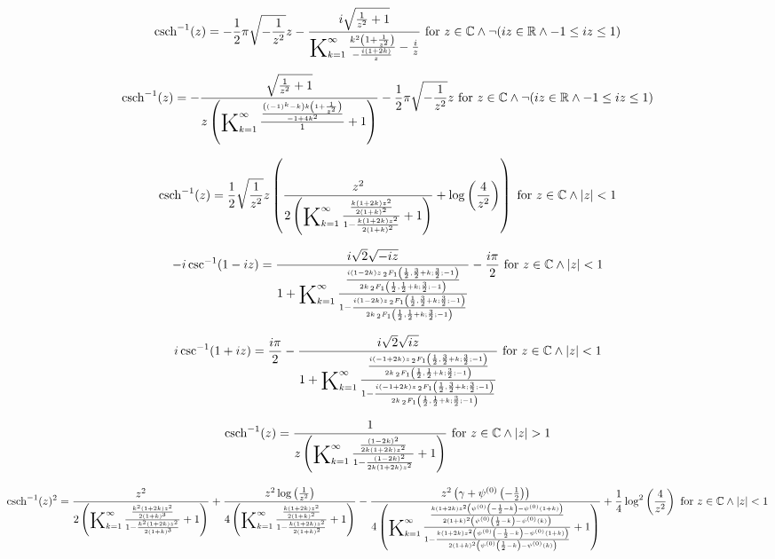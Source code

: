 \documentclass{article}
\newcommand{\bigK}{\mathop{\raisebox{-5pt}{\huge K}}}
\begin{document}
\[\text{csch}^{-1}(z)=-\frac{1}{2} \pi  \sqrt{-\frac{1}{z^2}} z-\frac{i \sqrt{\frac{1}{z^2}+1}}{\bigK_{k=1}^{\infty}\frac{k^2 \left(1+\frac{1}{z^2}\right)}{-\frac{i (1+2 k)}{z}}-\frac{i}{z}}\text{ for }z\in \mathbb{C}\land \neg (i z\in \mathbb{R}\land -1\leq i z\leq 1)\] 

\[\text{csch}^{-1}(z)=-\frac{\sqrt{\frac{1}{z^2}+1}}{z \left(\bigK_{k=1}^{\infty}\frac{\frac{\left((-1)^k-k\right) k \left(1+\frac{1}{z^2}\right)}{-1+4 k^2}}{1}+1\right)}-\frac{1}{2} \pi  \sqrt{-\frac{1}{z^2}} z\text{ for }z\in \mathbb{C}\land \neg (i z\in \mathbb{R}\land -1\leq i z\leq 1)\] 

\[\text{csch}^{-1}(z)=\frac{1}{2} \sqrt{\frac{1}{z^2}} z \left(\frac{z^2}{2 \left(\bigK_{k=1}^{\infty}\frac{\frac{k (1+2 k) z^2}{2 (1+k)^2}}{1-\frac{k (1+2 k) z^2}{2 (1+k)^2}}+1\right)}+\log \left(\frac{4}{z^2}\right)\right)\text{ for }z\in \mathbb{C}\land \left| z\right| <1\] 

\[-i \csc ^{-1}(1-i z)=\frac{i \sqrt{2} \sqrt{-i z}}{1+\bigK_{k=1}^{\infty}\frac{\frac{i (1-2 k) z \, _2F_1\left(\frac{1}{2},\frac{3}{2}+k;\frac{3}{2};-1\right)}{2 k \, _2F_1\left(\frac{1}{2},\frac{1}{2}+k;\frac{3}{2};-1\right)}}{1-\frac{i (1-2 k) z \, _2F_1\left(\frac{1}{2},\frac{3}{2}+k;\frac{3}{2};-1\right)}{2 k \, _2F_1\left(\frac{1}{2},\frac{1}{2}+k;\frac{3}{2};-1\right)}}}-\frac{i \pi }{2}\text{ for }z\in \mathbb{C}\land \left| z\right| <1\] 

\[i \csc ^{-1}(1+i z)=\frac{i \pi }{2}-\frac{i \sqrt{2} \sqrt{i z}}{1+\bigK_{k=1}^{\infty}\frac{\frac{i (-1+2 k) z \, _2F_1\left(\frac{1}{2},\frac{3}{2}+k;\frac{3}{2};-1\right)}{2 k \, _2F_1\left(\frac{1}{2},\frac{1}{2}+k;\frac{3}{2};-1\right)}}{1-\frac{i (-1+2 k) z \, _2F_1\left(\frac{1}{2},\frac{3}{2}+k;\frac{3}{2};-1\right)}{2 k \, _2F_1\left(\frac{1}{2},\frac{1}{2}+k;\frac{3}{2};-1\right)}}}\text{ for }z\in \mathbb{C}\land \left| z\right| <1\] 

\[\text{csch}^{-1}(z)=\frac{1}{z \left(\bigK_{k=1}^{\infty}\frac{\frac{(1-2 k)^2}{2 k (1+2 k) z^2}}{1-\frac{(1-2 k)^2}{2 k (1+2 k) z^2}}+1\right)}\text{ for }z\in \mathbb{C}\land \left| z\right| >1\] 

\[\text{csch}^{-1}(z)^2=\frac{z^2}{2 \left(\bigK_{k=1}^{\infty}\frac{\frac{k^2 (1+2 k) z^2}{2 (1+k)^3}}{1-\frac{k^2 (1+2 k) z^2}{2 (1+k)^3}}+1\right)}+\frac{z^2 \log \left(\frac{1}{z^2}\right)}{4 \left(\bigK_{k=1}^{\infty}\frac{\frac{k (1+2 k) z^2}{2 (1+k)^2}}{1-\frac{k (1+2 k) z^2}{2 (1+k)^2}}+1\right)}-\frac{z^2 \left(\gamma +\psi ^{(0)}\left(-\frac{1}{2}\right)\right)}{4 \left(\bigK_{k=1}^{\infty}\frac{\frac{k (1+2 k) z^2 \left(\psi ^{(0)}\left(-\frac{1}{2}-k\right)-\psi ^{(0)}(1+k)\right)}{2 (1+k)^2 \left(\psi ^{(0)}\left(\frac{1}{2}-k\right)-\psi ^{(0)}(k)\right)}}{1-\frac{k (1+2 k) z^2 \left(\psi ^{(0)}\left(-\frac{1}{2}-k\right)-\psi ^{(0)}(1+k)\right)}{2 (1+k)^2 \left(\psi ^{(0)}\left(\frac{1}{2}-k\right)-\psi ^{(0)}(k)\right)}}+1\right)}+\frac{1}{4} \log ^2\left(\frac{4}{z^2}\right)\text{ for }z\in \mathbb{C}\land \left| z\right| <1\] 
\end{document}
